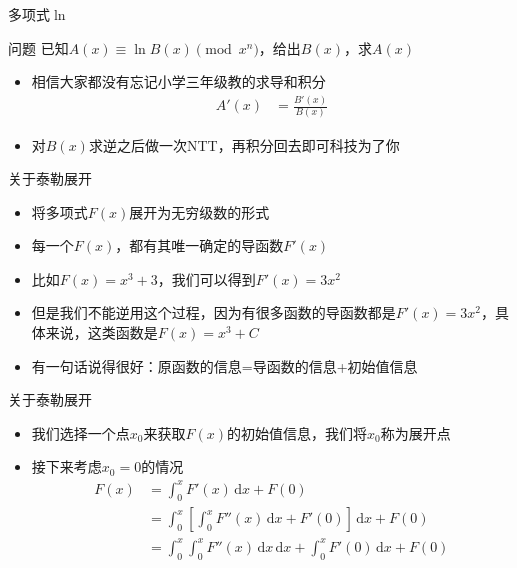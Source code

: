 \documentclass{beamer}
\begin{document}
\begin{frame}{多项式$\ln$}
    \begin{block}{问题}
        已知$A(x)\equiv \ln B(x) \pmod {x^n}$，给出$B(x)$，求$A(x)$
    \end{block} \pause
    \begin{itemize}
        \item 相信大家都没有忘记小学三年级教的求导和积分 \pause
        $$\begin{aligned}
            A'(x) &= \frac{B'(x)}{B(x)}
        \end{aligned}$$ \pause
        \item 对$B(x)$求逆之后做一次NTT，再积分回去即可科技为了你
    \end{itemize}
\end{frame}

\begin{frame}{关于泰勒展开}
    \begin{itemize}
        \item 将多项式$F(x)$展开为无穷级数的形式 \pause
        \item 每一个$F(x)$，都有其唯一确定的导函数$F'(x)$ 
        \item 比如$F(x) = x^3 + 3$，我们可以得到$F'(x) = 3x^2$ \pause
        \item 但是我们不能逆用这个过程，因为有很多函数的导函数都是$F'(x) = 3x^2$，具体来说，这类函数是$F(x) = x^3 + C$ \pause
        \item 有一句话说得很好：原函数的信息=导函数的信息+初始值信息 \pause
    \end{itemize}
\end{frame}

\begin{frame}{关于泰勒展开}
    \begin{itemize}
        \item 我们选择一个点$x_0$来获取$F(x)$的初始值信息，我们将$x_0$称为展开点 \pause
        \item 接下来考虑$x_0 = 0$的情况 \pause
        $$\begin{aligned}
            F(x) &= \int_{0}^x F'(x) \,\mathrm{d}x + F(0)\\
            &= \int_{0}^x \left[\int_{0}^x F''(x) \,\mathrm{d}x + F'(0)\right] \,\mathrm{d}x + F(0)\\
            &= \int_{0}^x \int_{0}^x F''(x) \,\mathrm{d}x \,\mathrm{d}x + \int_{0}^x F'(0) \,\mathrm{d}x + F(0)
        \end{aligned}$$
    \end{itemize}
\end{frame}
\end{document}
